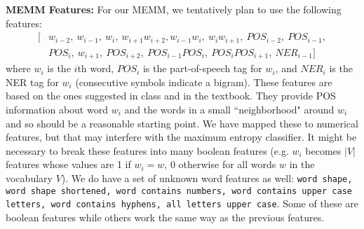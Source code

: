 \documentclass[12pt]{article}
\begin{document}
\textbf{MEMM Features:}
For our MEMM, we tentatively plan to use the following features:
\begin{equation*}
\begin{split}
[&w_{i - 2},\ w_{i - 1},\ w_i,\ w_{i + 1}w_{i + 2}, 
w_{i - 1}w_i,\ w_iw_{i + 1},\ POS_{i - 2},\ POS_{i - 1},\\ &POS_i,\ w_{i + 1},\ POS_{i + 2}, \ POS_{i - 1}POS_i,\ POS_iPOS_{i + 1},\ NER_{i - 1}]
\end{split}
\end{equation*}
where $w_i$ is the $i$th word, $POS_i$ is the part-of-speech tag for $w_i$, and $NER_i$ is the NER tag for $w_i$ (consecutive symbols indicate a bigram). These features are based on the ones suggested in class and in the textbook. They provide POS information about word $w_i$ and the words in a small ``neighborhood" around $w_i$ and so should be a reasonable starting point. We have mapped these to numerical features, but that may interfere with the maximum entropy classifier. It might be necessary to break these features into many boolean features (e.g. $w_i$ becomes $|V|$ features whose values are 1 if $w_i = w$, 0 otherwise for all words $w$ in the vocabulary $V$). We do have a set of unknown word features as well:
{\tt word shape, word shape shortened, word contains numbers, word contains upper case letters, word contains hyphens, all letters upper case}. Some of these are boolean features while others work the same way as the previous features. 
   
\end{document}
